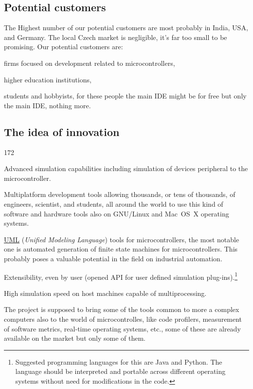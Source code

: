 \documentclass[a4paper,twoside,15pt]{book}
\begin{document}
		\subsection{Potential customers}
			The Highest number of our potential customers are most probably in India, USA, and Germany. The local Czech market is negligible, it's far too small to be promising.
			Our potential customers are:
			\begin{dinglist}{73}
				\item firms focused on development related to microcontrollers,
				\item higher education institutions,
				\item students and hobbyists, for these people the main IDE might be for free but only the main IDE, nothing more.
			\end{dinglist}

		\subsection{The idea of innovation}
			\begin{dingautolist}{172}
				\item Advanced simulation capabilities including simulation of devices peripheral to the microcontroller.
				\item Multiplatform development tools allowing thousands, or tens of thousands, of engineers, scientist, and students, all around the world to use this kind of software and hardware tools also on GNU/Linux and Mac~OS~X operating systems.
				\item \href{http://en.wikipedia.org/wiki/Unified_Modeling_Language}{UML} (\textit{Unified Modeling Language}) tools for microcontrollers, the most notable one is automated generation of finite state machines for microcontrollers. This probably poses a valuable potential in the field on industrial automation.
				\item Extensibility, even by user (opened API for user defined simulation plug-ins).\footnote{Suggested programming languages for this are Java and Python. The language should be interpreted and portable across different operating systems without need for modifications in the code.}
				\item High simulation speed on host machines capable of multiprocessing.
				\item The project is supposed to bring some of the tools common to more a complex computers also to the world of microcontrolles, like code profilers, measurement of software metrics, real-time operating systems, etc., some of these are already available on the market but only some of them.
			\end{dingautolist}
\end{document}
